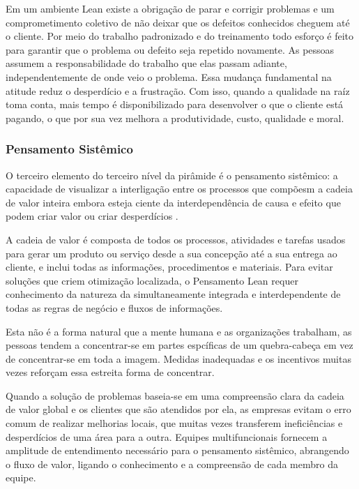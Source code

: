 Em um ambiente Lean existe a obrigação de parar e corrigir problemas e um comprometimento coletivo de não deixar que os defeitos conhecidos cheguem até o cliente. Por meio do trabalho padronizado e do treinamento todo esforço é feito para garantir que o problema ou defeito seja repetido novamente. As pessoas assumem a responsabilidade do trabalho que elas passam adiante, independentemente de onde veio o problema. Essa mudança fundamental na atitude reduz o desperdício e a frustração. Com isso, quando a qualidade na raíz toma conta, mais tempo é disponibilizado para desenvolver o que o cliente está pagando, o que por sua vez melhora a produtividade, custo, qualidade e moral.

\subsubsection[Pensamento Sistêmico]{Pensamento Sistêmico}

O terceiro elemento do terceiro nível da pirâmide é o pensamento sistêmico: a capacidade de visualizar a interligação entre os processos que compõesm a cadeia de valor inteira embora esteja ciente da interdependência de causa e efeito que podem criar valor ou criar desperdícios \cite{bell2011}.

A cadeia de valor é composta de todos os processos, atividades e tarefas usados para gerar um produto ou serviço desde a sua concepção até a sua entrega ao cliente, e inclui todas as informações, procedimentos e materiais. Para evitar soluções que criem otimização localizada, o Pensamento Lean requer conhecimento da natureza da simultaneamente integrada e interdependente  de todas as regras de negócio e fluxos de informações.   

Esta não é a forma natural que a mente humana e as organizações trabalham, as pessoas tendem a concentrar-se em partes espcíficas de um quebra-cabeça em vez de concentrar-se em toda a imagem. Medidas inadequadas e os incentivos muitas vezes reforçam essa estreita forma de concentrar.

Quando a solução de problemas baseia-se em uma compreensão clara da cadeia de valor global e os clientes que são atendidos por ela, as empresas evitam o erro comum de realizar melhorias locais, que muitas vezes transferem ineficiências e desperdícios de uma área para a outra. Equipes multifuncionais fornecem a amplitude de entendimento necessário para o pensamento sistêmico, abrangendo o fluxo de valor, ligando o conhecimento e a compreensão de cada membro da equipe.

